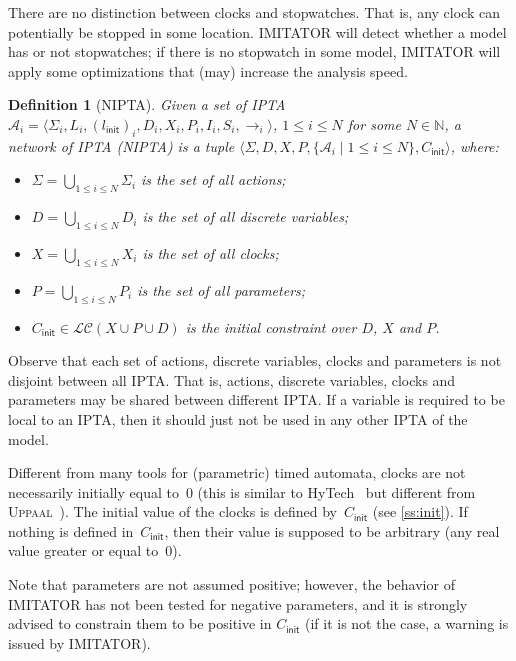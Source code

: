 \documentclass[a4paper,11pt]{report}
\def\init{\ensuremath{\textsf{init}}} %
\newcommand{\A}{\mathcal{A}}
\newcommand{\Action}{\ensuremath{\Sigma}}
\newcommand{\C}{C}
\newcommand{\Cinit}{\C_\init} %
\newcommand{\Clock}{X} %
\newcommand{\DVar}{D} %
\newcommand{\invariant}{I}
\newcommand{\LConstraint}{\mathcal{LC}} %
\newcommand{\LConstraintXPD}{\LConstraint(\Clock \cup \Param \cup \DVar)}
\newcommand{\loc}{l} %
\newcommand{\locinit}{\loc_\init}
\newcommand{\Loc}{L} %
\newcommand{\Param}{P} %
\newcommand{\steps}{ {\rightarrow} }
\newcommand{\stopwatches}{S}
\newcommand{\tuple}[1]{\langle#1\rangle}
\newcommand{\grandn}{{\mathbb N}}
\newcommand{\hytech}{{\sc HyTech}}
\newcommand{\imitator}{\textsf{IMITATOR}}
\newcommand{\IPTA}{IPTA}
\newcommand{\NIPTA}{NIPTA}
\newcommand{\uppaal}{\textsc{Uppaal}}
\newtheorem{definition}{Definition}
\begin{document}
There are no distinction between clocks and stopwatches.
That is, any clock can potentially be stopped in some location.
\imitator{} will detect whether a model has or not stopwatches; if there is no stopwatch in some model, \imitator{} will apply some optimizations that (may) increase the analysis speed.


\begin{definition}[\NIPTA{}]
	Given a set of \IPTA{} $\A_i = \tuple{\Action_i, \Loc_i, (\locinit)_i, \DVar_i, \Clock_i, \Param_i, \invariant_i, \stopwatches_i, \steps_i}$, $1 \leq i \leq N$ for some $N \in \grandn$,
	a network of \IPTA{} (\emph{\NIPTA{}}) is a tuple
		$\tuple{\Action, \DVar, \Clock, \Param, \{ \A_i \mid 1 \leq i \leq N \}, \Cinit}$, where:
	\begin{itemize}
		\item $\Action = \bigcup_{1 \leq i \leq N} \Action_i$ is the set of all actions;
		\item $\DVar = \bigcup_{1 \leq i \leq N} \DVar_i$ is the set of all discrete variables;
		\item $\Clock = \bigcup_{1 \leq i \leq N} \Clock_i$ is the set of all clocks;
		\item $\Param = \bigcup_{1 \leq i \leq N} \Param_i$ is the set of all parameters;
		\item $\Cinit \in \LConstraintXPD$ is the initial constraint over $\DVar$, $\Clock$ and $\Param$. %
	\end{itemize}
\end{definition}

Observe that each set of actions, discrete variables, clocks and parameters is not disjoint between all \IPTA{}.
That is, actions, discrete variables, clocks and parameters may be shared between different \IPTA{}.
If a variable is required to be local to an \IPTA{}, then it should just not be used in any other \IPTA{} of the model.

Different from many tools for (parametric) timed automata, clocks are not necessarily initially equal to~0 (this is similar to \hytech{}~\cite{HHW95} but different from \uppaal{}~\cite{LPY97}).
The initial value of the clocks is defined by~$\Cinit$ (see \cref{ss:init}).
If nothing is defined in~$\Cinit$, then their value is supposed to be arbitrary (any real value greater or equal to~0).

Note that parameters are not assumed positive; however, the behavior of \imitator{} has not been tested for negative parameters, and it is strongly advised to constrain them to be positive in $\Cinit$ (if it is not the case, a warning is issued by \imitator{}).
\end{document}

